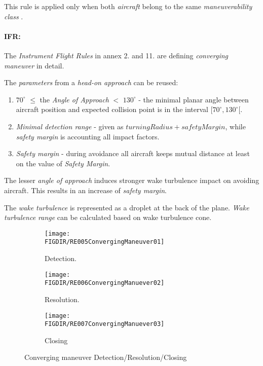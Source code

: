 \begin{note}
    This rule is applied only when both \emph{aircraft} belong to the same  \emph{maneuverability class} \cite{icaoAnnex2}.
\end{note}

\paragraph{IFR:} The \emph{Instrument Flight Rules} in annex 2. \cite{icaoAnnex2} and 11. \cite{icaoAnnex11} are defining \emph{converging maneuver} in detail.

The \emph{parameters} from a \emph{head-on approach} can be reused:
\begin{enumerate}
    \item $70^\circ$ $\le$ the \emph{Angle of Approach} $<$ $130^\circ$ - the minimal planar angle between aircraft position and expected collision point is in the interval $[70^\circ , 130^\circ[$.
    
    \item\emph{Minimal detection range} - given as $turning Radius + safety Margin$, while \emph{safety margin} is accounting all impact factors. 
    
    \item\emph{Safety margin} - during avoidance all aircraft keeps mutual distance at least on the value of \emph{Safety Margin}.
\end{enumerate}

\begin{note}
The lesser \emph{angle of approach} induces stronger wake turbulence impact on avoiding aircraft. This results in an increase of \emph{safety margin}. 

The \emph{wake turbulence} is represented as a droplet at the back of the plane. \emph{Wake turbulence range} can be calculated based on wake turbulence cone.
\end{note}

\begin{figure}[H]
	\centering
    \begin{subfigure}{0.32\textwidth}
    	\centering
        \texttt{[image: \\FIGDIR/RE005ConvergingManeuver01]} 
        \caption{Detection.}
        \label{fig:ConvergingManeuverTheoreticalDetection}
    \end{subfigure}
    \begin{subfigure}{0.32\textwidth}
        \centering
        \texttt{[image: \\FIGDIR/RE006ConvergingManuever02]} 
        \caption{Resolution.}
        \label{fig:ConvergingManeuverTheoreticalResolution}
    \end{subfigure}
    \begin{subfigure}{0.32\textwidth}
        \centering
        \texttt{[image: \\FIGDIR/RE007ConvergingManuever03]} 
        \caption{Closing}
        \label{fig:ConvergingManeuverTheoreticalClosure}
    \end{subfigure}
    \caption{Converging maneuver Detection/Resolution/Closing}
    \label{fig:ConvergingManeuverTheoretical}
\end{figure}

